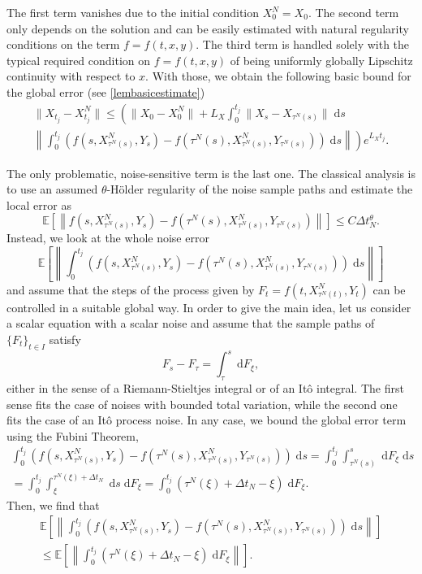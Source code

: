 \documentclass[reqno,12pt]{amsart}
\theoremstyle{plain} %
\theoremstyle{definition} %
\begin{document}
The first term vanishes due to the initial condition $X_0^N = X_0$. The second term only depends on the solution and can be easily estimated with natural regularity conditions on the term $f=f(t, x, y)$. The third term is handled solely with the typical required condition on $f=f(t, x, y)$ of being uniformly globally Lipschitz continuity with respect to $x$. With those, we obtain the following basic bound for the global error (see \cref{lembasicestimate})
\begin{multline}
    \label{Etjbasicboundintro}
        \|X_{t_j} - X_{t_j}^N\| \leq \left( \|X_0 - X_0^N\| + L_X \int_0^{t_j} \|X_s - X_{\tau^N(s)}\| \;\mathrm{d}s \right. \\
        \left. \left\|\int_0^{t_j} \left( f(s, X_{\tau^N(s)}^N, Y_s) - f(\tau^N(s), X_{\tau^N(s)}^N, Y_{\tau^N(s)}) \right)\;\mathrm{d}s\right\|\right) e^{L_X t_j}.
\end{multline}

The only problematic, noise-sensitive term is the last one. The classical analysis is to use an assumed $\theta$-H\"older regularity of the noise sample paths and estimate the local error as
\[
    \mathbb{E}\left[\left\|f(s, X_{\tau^N(s)}^N, Y_s) - f(\tau^N(s), X_{\tau^N(s)}^N, Y_{\tau^N(s)})\right\|\right] \leq C\Delta t_N^{\theta}.
\]
Instead, we look at the whole noise error 
\[
    \mathbb{E}\left[\left\|\int_0^{t_j} \left( f(s, X_{\tau^N(s)}^N, Y_s) - f(\tau^N(s), X_{\tau^N(s)}^N, Y_{\tau^N(s)}) \right)\;\mathrm{d}s\right\|\right]
\]
and assume that the steps of the process given by $F_t = f(t, X_{\tau^N(t)}^N, Y_t)$ can be controlled in a suitable global way. In order to give the main idea, let us consider a scalar equation with a scalar noise and assume that the sample paths of $\{F_t\}_{t\in I}$ satisfy
\[
    F_s - F_\tau = \int_\tau^s \;\mathrm{d}F_\xi,
\]
either in the sense of a Riemann-Stieltjes integral or of an It\^o integral. The first sense fits the case of noises with bounded total variation, while the second one fits the case of an It\^o process noise. In any case, we bound the global error term using the Fubini Theorem,
\begin{multline*}
    \int_0^{t_j} \left( f(s, X_{\tau^N(s)}^N, Y_s) - f(\tau^N(s), X_{\tau^N(s)}^N, Y_{\tau^N(s)}) \right)\;\mathrm{d}s = \int_0^{t_j} \int_{\tau^N(s)}^s \;\mathrm{d}  F_\xi\;\mathrm{d}s \\
    = \int_0^{t_j} \int_{\xi}^{\tau^N(\xi) + \Delta t_N} \;\mathrm{d}s \;\mathrm{d} F_\xi  = \int_0^{t_j} (\tau^N(\xi) + \Delta t_N - \xi) \;\mathrm{d} F_\xi.
\end{multline*}
Then, we find that
\begin{multline*}
    \mathbb{E}\left[\left\| \int_0^{t_j} \left( f(s, X_{\tau^N(s)}^N, Y_s) - f(\tau^N(s), X_{\tau^N(s)}^N, Y_{\tau^N(s)}) \right)\;\mathrm{d}s\right\|\right] \\
    \leq \mathbb{E}\left[\left\| \int_0^{t_j} (\tau^N(\xi) + \Delta t_N - \xi) \;\mathrm{d} F_\xi \right\|\right].
\end{multline*}
\end{document}
